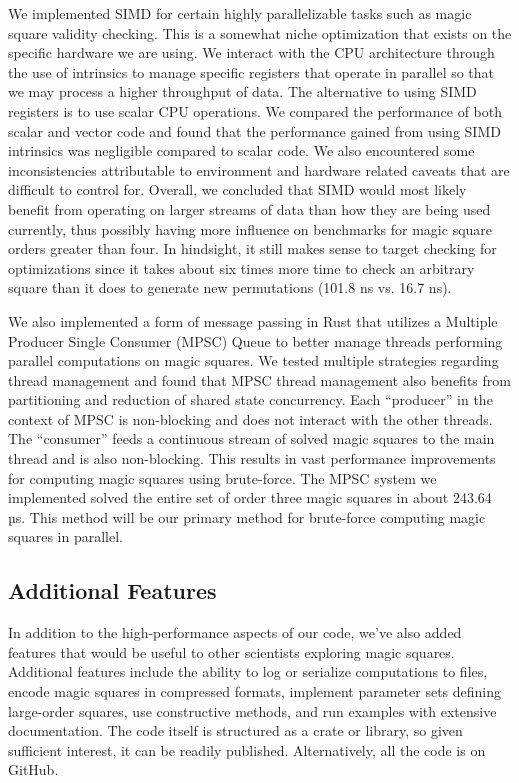 \documentclass{rhumj_new}
\begin{document}
We implemented SIMD for certain highly parallelizable tasks such as magic square validity
checking. This is a somewhat niche optimization that exists on the specific hardware we are using.
We interact with the CPU architecture through the use of intrinsics to manage specific registers
that operate in parallel so that we may process a higher throughput of data. The alternative to
using SIMD registers is to use scalar CPU operations. We compared the performance of both scalar
and vector code and found that the performance gained from using SIMD intrinsics was negligible
compared to scalar code. We also encountered some inconsistencies attributable to environment and
hardware related caveats that are difficult to control for. Overall, we concluded that SIMD would
most likely benefit from operating on larger streams of data than how they are being used
currently, thus possibly having more influence on benchmarks for magic square orders greater than
four. In hindsight, it still makes sense to target checking for optimizations since it takes about
six times more time to check an arbitrary square than it does to generate new permutations (101.8
ns vs. 16.7 ns).

We also implemented a form of message passing in Rust that utilizes a Multiple Producer Single
Consumer (MPSC) Queue to better manage threads performing parallel computations on magic squares.
We tested multiple strategies regarding thread management and found that MPSC thread management
also benefits from partitioning and reduction of shared state concurrency. Each ``producer'' in the
context of MPSC is non-blocking and does not interact with the other threads. The ``consumer''
feeds a continuous stream of solved magic squares to the main thread and is also non-blocking. This
results in vast performance improvements for computing magic squares using brute-force. The MPSC
system we implemented solved the entire set of order three magic squares in about 243.64 µs. This
method will be our primary method for brute-force computing magic squares in parallel.

\subsection{Additional Features}

In addition to the high-performance aspects of our code, we've also added features that would
be useful to other scientists exploring magic squares. Additional features include the ability to
log or serialize computations to files, encode magic squares in compressed formats, implement
parameter sets defining large-order squares, use constructive methods, and run examples with
extensive documentation. The code itself is structured as a crate or library, so given sufficient
interest, it can be readily published. Alternatively, all the code is on GitHub\cite{Keough}.
\end{document}
